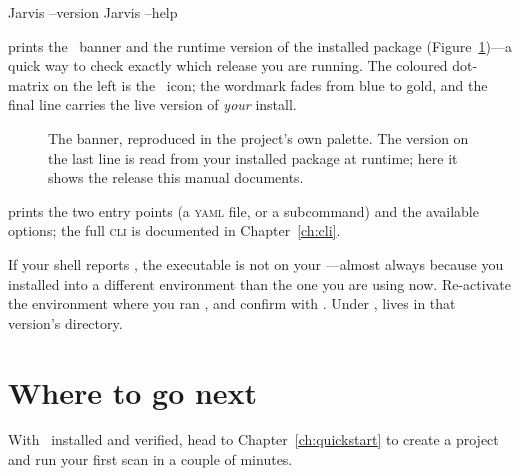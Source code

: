 \begin{shellbox}
Jarvis --version
Jarvis --help
\end{shellbox}

\noindent {} prints the \Jarvis\ banner and the runtime version of the
installed package (Figure~\ref{fig:version-banner})---a quick way to check exactly which
release you are running. The coloured dot-matrix on the left is the \Jarvis\ icon; the wordmark
fades from blue to gold, and the final line carries the live version of \emph{your} install.

\begin{figure}[ht]
\centering
\JarvisVersionBanner
\caption[The  banner.]{The  banner, reproduced
in the project's own palette. The version on the last line is read from your installed package
at runtime; here it shows the release this manual documents.}
\label{fig:version-banner}
\end{figure}

\noindent {} prints the two entry points (a \textsc{yaml} file, or a
 subcommand) and the available options; the full \textsc{cli} is documented in
Chapter~\ref{ch:cli}.

\begin{jwarn}
If your shell reports , the executable is not on your
---almost always because you installed into a different environment than the one
you are using now. Re-activate the environment where you ran , and confirm
with . Under ,  lives in that version's 
directory.
\end{jwarn}

\section{Where to go next}
\label{sec:install-next}

With \Jarvis\ installed and verified, head to Chapter~\ref{ch:quickstart} to create a project
and run your first scan in a couple of minutes.
